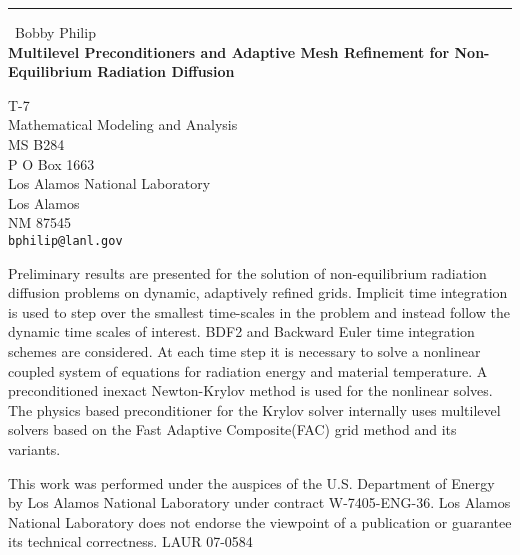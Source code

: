 \documentclass{report}
\begin{document}
\begin{center}
\rule{6in}{1pt} \
{\large Bobby Philip \\
{\bf Multilevel Preconditioners and Adaptive Mesh Refinement for Non-Equilibrium Radiation Diffusion}}

T-7 \\ Mathematical Modeling and Analysis \\ MS B284 \\ P O Box 1663 \\ Los Alamos National Laboratory \\ Los Alamos \\ NM 87545
\\
{\tt bphilip@lanl.gov}\end{center}

Preliminary results are presented for the solution of non-equilibrium
radiation diffusion problems on dynamic, adaptively refined grids.
Implicit time integration is used to step over the smallest time-scales
in the problem and instead follow the dynamic time scales of interest.
BDF2 and Backward Euler time integration schemes are considered. At each
time step it is necessary to solve a nonlinear coupled system of
equations for radiation energy and material temperature. A preconditioned
inexact Newton-Krylov method is used for the nonlinear solves. The
physics based preconditioner for the Krylov solver internally uses
multilevel solvers based on the Fast Adaptive Composite(FAC) grid method
and its variants.

This work was performed under the auspices of the U.S. Department of
Energy by Los Alamos National Laboratory under contract W-7405-ENG-36.
Los Alamos National Laboratory does not endorse the viewpoint of a
publication or guarantee its technical correctness. LAUR 07-0584
\end{document}
